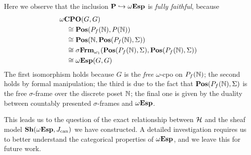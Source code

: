 Here we observe that the inclusion $\mathbf{P} \hookrightarrow \omega\mathbf{Esp}$ is \emph{fully faithful}, because
\begin{align*}
  &\omega\mathbf{CPO}(G,G) \\
  &\quad\cong \mathbf{Pos}(P_f(\mathbb{N}),P(\mathbb{N})) \\
  &\quad\cong \mathbf{Pos}(\mathbb{N},\mathbf{Pos}(P_f(\mathbb{N}),\Sigma)) \\
  &\quad\cong \sigma\mathbf{Frm}_{\omega_1}(\mathbf{Pos}(P_f(\mathbb{N}),\Sigma),\mathbf{Pos}(P_f(\mathbb{N}),\Sigma)) \\ 
  &\quad\cong \omega\mathbf{Esp}(G,G)
\end{align*}
The first isomorphism holds because $G$ is the \emph{free} $\omega$-cpo on $P_f(\mathbb{N})$; the second holds by formal manipulation; the third is due to the fact that $\mathbf{Pos}(P_f(\mathbb{N}),\Sigma)$ is the free $\sigma$-frame over the discrete poset $\mathbb{N}$; the final one is given by the duality between countably presented $\sigma$-frames and $\omega\mathbf{Esp}$. 

This leads us to the question of the exact relationship between $\mathcal{H}$ and the sheaf model $\mathbf{Sh}(\omega\mathbf{Esp},J_{\mathrm{can}})$ we have constructed. A detailed investigation requires us to better understand the categorical properties of $\omega\mathbf{Esp}$, and we leave this for future work.








